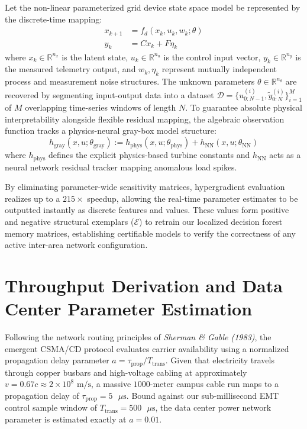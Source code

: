\documentclass[11pt,fleqn]{article}
\begin{document}
Let the non-linear parameterized grid device state space model be represented by the discrete-time mapping:
\begin{align}
x_{k+1} &= f_d(x_k, u_k, w_k; \theta) \\
y_k &= C x_k + F \eta_k
\end{align}
where $x_k \in \mathbb{R}^{n_x}$ is the latent state, $u_k \in \mathbb{R}^{n_u}$ is the control input vector, $y_k \in \mathbb{R}^{n_y}$ is the measured telemetry output, and $w_k, \eta_k$ represent mutually independent process and measurement noise structures. The unknown parameters $\theta \in \mathbb{R}^{n_\theta}$ are recovered by segmenting input-output data into a dataset $\mathcal{D} = \{u_{0:N-1}^{(i)}, \tilde{y}_{0:N}^{(i)}\}_{i=1}^M$ of $M$ overlapping time-series windows of length $N$. To guarantee absolute physical interpretability alongside flexible residual mapping, the algebraic observation function tracks a physics-neural gray-box model structure:
\begin{equation}
h_{\text{gray}}(x, u; \theta_{\text{gray}}) := h_{\text{phys}}(x, u; \theta_{\text{phys}}) + h_{\text{NN}}(x, u; \theta_{\text{NN}})
\end{equation}
where $h_{\text{phys}}$ defines the explicit physics-based turbine constants and $h_{\text{NN}}$ acts as a neural network residual tracker mapping anomalous load spikes. 

By eliminating parameter-wide sensitivity matrices, hypergradient evaluation realizes up to a $215\times$ speedup, allowing the real-time parameter estimates to be outputted instantly as discrete features and values. These values form positive and negative structural exemplars ($\mathcal{E}$) to retrain our localized decision forest memory matrices, establishing certifiable models to verify the correctness of any active inter-area network configuration.

\section{Throughput Derivation and Data Center Parameter Estimation}
Following the network routing principles of \textit{Sherman \& Gable (1983)}, the emergent CSMA/CD protocol evaluates carrier availability using a normalized propagation delay parameter $a = \tau_{\text{prop}} / T_{\text{trans}}$. Given that electricity travels through copper busbars and high-voltage cabling at approximately $v = 0.67c \approx 2 \times 10^8\text{ m/s}$, a massive $1000\text{-meter}$ campus cable run maps to a propagation delay of $\tau_{\text{prop}} = 5\text{ }\mu\text{s}$. Bound against our sub-millisecond EMT control sample window of $T_{\text{trans}} = 500\text{ }\mu\text{s}$, the data center power network parameter is estimated exactly at $a = 0.01$. 
\end{document}
